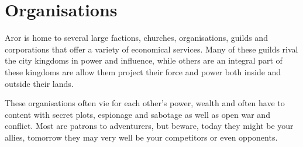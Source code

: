 \section{Organisations}
\label{sec:Organisations}

Aror is home to several large factions, churches, organisations, guilds and
corporations that offer a variety of economical services. Many of these guilds
rival the city kingdoms in power and influence, while others are an integral
part of these kingdoms are allow them project their force and power both
inside and outside their lands.

These organisations often vie for each other's power, wealth and often have
to content with secret plots, espionage and sabotage as well as open war
and conflict. Most are patrons to adventurers, but beware, today they might
be your allies, tomorrow they may very well be your competitors or even
opponents.

%


